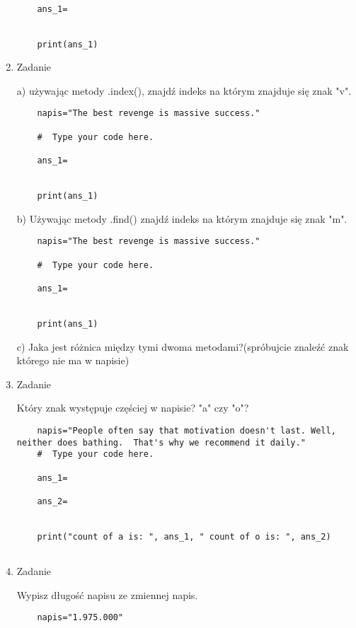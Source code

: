 \documentclass[11pt]{article}
\begin{document}
\begin{enumerate}
\begin{lstlisting}
	
	ans_1=
	
	
	print(ans_1)
\end{lstlisting}


	\item 
\begin{Large}
	Zadanie
\end{Large}
\par
a) używając metody .index(), znajdź indeks na którym znajduje się znak "v".
\begin{lstlisting}
	napis="The best revenge is massive success."
	
	#  Type your code here.
	
	ans_1=
	
	
	print(ans_1)
\end{lstlisting}
\par
b) Używając metody .find() znajdź indeks na którym znajduje się znak "m".
\begin{lstlisting}
	napis="The best revenge is massive success."
	
	#  Type your code here.
	
	ans_1=
	
	
	print(ans_1)
\end{lstlisting}
\par
c) Jaka jest różnica między tymi dwoma metodami?(spróbujcie znaleźć znak którego nie ma w napisie)

	\item 
\begin{Large}
	Zadanie
\end{Large}
\par
Który znak występuje częściej w napisie? "a" czy "o"?
\begin{lstlisting}
	napis="People often say that motivation doesn't last. Well, neither does bathing.  That's why we recommend it daily."
	#  Type your code here.
	
	ans_1=
	
	ans_2=
	
	
	print("count of a is: ", ans_1, " count of o is: ", ans_2)
	
\end{lstlisting}

	\item 
\begin{Large}
	Zadanie
\end{Large}
\par
Wypisz długość napisu ze zmiennej napis.
\begin{lstlisting}
	napis="1.975.000"
	

\end{lstlisting}
\end{enumerate}
\end{document}
